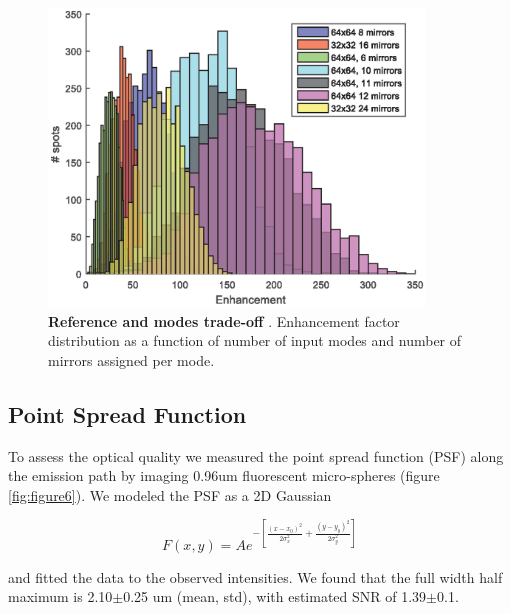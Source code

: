 \documentclass[10pt]{article}
\begin{document}
\begin{figure}
\centering\includegraphics[width=10cm]{figure14}
\caption{\textbf{Reference and modes trade-off }. Enhancement factor distribution as a function of number of input modes and number of mirrors assigned per mode.}
\label{fig:figure14}
\end{figure}

\subsection{Point Spread Function}
To assess the optical quality we measured the point spread function (PSF)
along the emission path by imaging 0.96um fluorescent micro-spheres (figure \ref{fig:figure6}). We modeled the PSF as a 2D Gaussian

\[F\left( {x,y} \right) = A{e^{ - \left[ {\frac{{{{\left( {x - {x_0}} \right)}^2}}}{{2\sigma _x^2}} + \frac{{{{\left( {y - {y_0}} \right)}^2}}}{{2\sigma _y^2}}} \right]}}\]

and fitted the data to the observed intensities. We found that the full width half maximum is 2.10$\pm$0.25 um (mean, std), with estimated SNR of 1.39$\pm$0.1.
\end{document}
